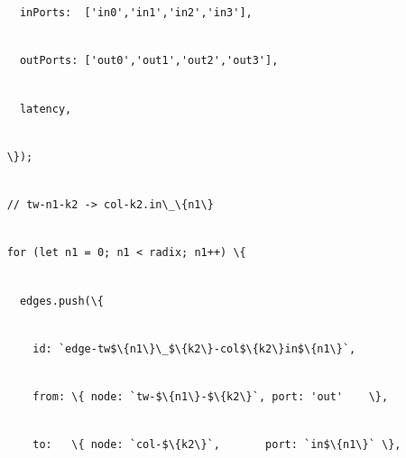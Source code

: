 \documentclass[
]{article}
\newcommand{\passthrough}[1]{#1}
\begin{document}
\passthrough{\lstinline!      !}\passthrough{\lstinline!inPorts!}\passthrough{\lstinline!:!}\passthrough{\lstinline!  !}\passthrough{\lstinline!['in0','in1','in2','in3'],!}\strut \\
\passthrough{\lstinline!      !}\passthrough{\lstinline!outPorts!}\passthrough{\lstinline!:!}\passthrough{\lstinline! !}\passthrough{\lstinline!['out0','out1','out2','out3'],!}\strut \\
\passthrough{\lstinline!      !}\passthrough{\lstinline!latency,!}\strut \\
\passthrough{\lstinline!    !}\passthrough{\lstinline!\});!}\strut \\
\passthrough{\lstinline!    !}\passthrough{\lstinline!//!}\passthrough{\lstinline! !}\passthrough{\lstinline!tw-n1-k2!}\passthrough{\lstinline! !}\passthrough{\lstinline!->!}\passthrough{\lstinline! !}\passthrough{\lstinline!col-k2.in\_\{n1\}!}\strut \\
\passthrough{\lstinline!    !}\passthrough{\lstinline!for!}\passthrough{\lstinline! !}\passthrough{\lstinline!(let!}\passthrough{\lstinline! !}\passthrough{\lstinline!n1!}\passthrough{\lstinline! !}\passthrough{\lstinline!=!}\passthrough{\lstinline! !}\passthrough{\lstinline!0;!}\passthrough{\lstinline! !}\passthrough{\lstinline!n1!}\passthrough{\lstinline! !}\passthrough{\lstinline!<!}\passthrough{\lstinline! !}\passthrough{\lstinline!radix;!}\passthrough{\lstinline! !}\passthrough{\lstinline!n1++)!}\passthrough{\lstinline! !}\passthrough{\lstinline!\{!}\strut \\
\passthrough{\lstinline!      !}\passthrough{\lstinline!edges.push!}\passthrough{\lstinline!(\{!}\strut \\
\passthrough{\lstinline!        !}\passthrough{\lstinline!id:!}\passthrough{\lstinline! !}\passthrough{\lstinline!`edge-!}\passthrough{\lstinline!tw!}\passthrough{\lstinline!$\{n1\}\_$\{k2\}-col$\{k2\}in$\{n1\}`,!}\strut \\
\passthrough{\lstinline!        !}\passthrough{\lstinline!from:!}\passthrough{\lstinline! !}\passthrough{\lstinline!\{!}\passthrough{\lstinline! !}\passthrough{\lstinline!node:!}\passthrough{\lstinline! !}\passthrough{\lstinline!`!}\passthrough{\lstinline!tw!}\passthrough{\lstinline!-$\{n1\}-$\{k2\}`,!}\passthrough{\lstinline! !}\passthrough{\lstinline!port:!}\passthrough{\lstinline! !}\passthrough{\lstinline!'out'!}\passthrough{\lstinline!    !}\passthrough{\lstinline!\},!}\strut \\
\passthrough{\lstinline!        !}\passthrough{\lstinline!to:!}\passthrough{\lstinline!   !}\passthrough{\lstinline!\{!}\passthrough{\lstinline! !}\passthrough{\lstinline!node:!}\passthrough{\lstinline! !}\passthrough{\lstinline!`col-$\{k2\}`,!}\passthrough{\lstinline!       !}\passthrough{\lstinline!port:!}\passthrough{\lstinline! !}\passthrough{\lstinline!`in$\{n1\}`!}\passthrough{\lstinline! !}\passthrough{\lstinline!\},!}\strut \\
\end{document}
